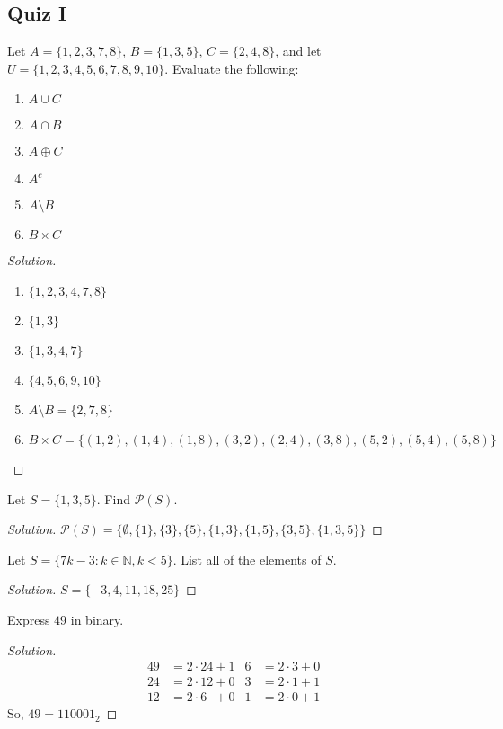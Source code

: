     \subsection{Quiz I}
    \begin{problem}
    Let $A = \{1,2,3,7,8\}$, $B = \{1,3,5\}$, $C = \{2,4,8\}$, and let $U = \{1,2,3,4,5,6,7,8,9,10\}$. Evaluate the following:
    \begin{enumerate}
        \item $A\cup C$
        \item $A\cap B$
        \item $A \oplus C$
        \item $A^c$
        \item $A\setminus B$
        \item $B\times C$
    \end{enumerate}
    \end{problem}
    \begin{proof}[Solution]
    \vspace{-\topsep}
    \
    \begin{enumerate}
        \item $\{1,2,3,4,7,8\}$
        \item $\{1,3\}$
        \item $\{1,3,4,7\}$
        \item $\{4,5,6,9,10\}$
        \item $A\setminus B = \{2,7,8\}$
        \item $B \times C = \{(1,2),(1,4),(1,8),(3,2),(2,4),(3,8),(5,2),(5,4),(5,8)\}$
    \end{enumerate}
    \end{proof}
    \begin{problem}
    Let $S = \{1,3,5\}$. Find $\mathcal{P}(S)$.
    \end{problem}
    \begin{proof}[Solution]
    \vspace{-0.5\topsep}
    $\mathcal{P}(S) = \{\emptyset,\{1\},\{3\},\{5\},\{1,3\},\{1,5\},\{3,5\},\{1,3,5\}\}$
    \end{proof}
    \begin{problem}
    Let $S = \{7k-3: k \in \mathbb{N}, k < 5\}$. List all of the elements of $S$.
    \end{problem}
    \begin{proof}[Solution]
    \vspace{-0.5\topsep}
    $S = \{-3,4,11,18,25\}$
    \end{proof}
    \begin{problem}
    Express $49$ in binary.
    \end{problem}
    \begin{proof}[Solution]
    \vspace{-\topsep}
    \
    \begin{align*}
        49 &= 2\cdot24+1 & 6&=2\cdot3+0\\
        24&= 2\cdot12+0 & 3&=2\cdot1+1\\
        12&= 2\cdot6\phantom{2}+0 & 1&=2\cdot0+1
    \end{align*}
    So, $49 = 110001_{2}$
    \end{proof} 
